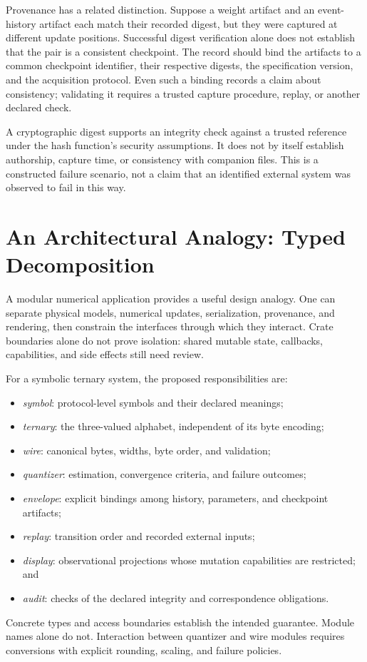 \documentclass[11pt]{article}
\begin{document}
Provenance has a related distinction. Suppose a weight artifact and an event-history artifact each match their recorded digest, but they were captured at different update positions. Successful digest verification alone does not establish that the pair is a consistent checkpoint. The record should bind the artifacts to a common checkpoint identifier, their respective digests, the specification version, and the acquisition protocol. Even such a binding records a claim about consistency; validating it requires a trusted capture procedure, replay, or another declared check.

A cryptographic digest supports an integrity check against a trusted reference under the hash function's security assumptions. It does not by itself establish authorship, capture time, or consistency with companion files. This is a constructed failure scenario, not a claim that an identified external system was observed to fail in this way.

\section{An Architectural Analogy: Typed Decomposition}

A modular numerical application provides a useful design analogy. One can separate physical models, numerical updates, serialization, provenance, and rendering, then constrain the interfaces through which they interact. Crate boundaries alone do not prove isolation: shared mutable state, callbacks, capabilities, and side effects still need review.

For a symbolic ternary system, the proposed responsibilities are:
\begin{itemize}
\item \emph{symbol}: protocol-level symbols and their declared meanings;
\item \emph{ternary}: the three-valued alphabet, independent of its byte encoding;
\item \emph{wire}: canonical bytes, widths, byte order, and validation;
\item \emph{quantizer}: estimation, convergence criteria, and failure outcomes;
\item \emph{envelope}: explicit bindings among history, parameters, and checkpoint artifacts;
\item \emph{replay}: transition order and recorded external inputs;
\item \emph{display}: observational projections whose mutation capabilities are restricted; and
\item \emph{audit}: checks of the declared integrity and correspondence obligations.
\end{itemize}
Concrete types and access boundaries establish the intended guarantee. Module names alone do not. Interaction between quantizer and wire modules requires conversions with explicit rounding, scaling, and failure policies.
\end{document}
